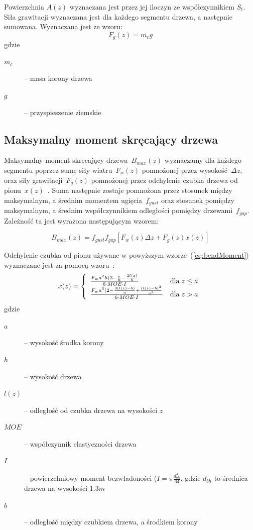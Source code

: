 Powierzchnia $A(z)$ wyznaczana jest przez jej iloczyn ze współczynnikiem $S_t$.
\\

Siła grawitacji wyznaczana jest dla każdego segmentu drzewa, a następnie sumowana. Wyznaczana jest ze wzoru:
\begin{equation}
\label{eq:gravityForce}
	F_g(z) = m_c g
\end{equation}
gdzie
\begin{description}
	\item[$m_c$] -- masa korony drzewa
	\item[$g$] -- przyspieszenie ziemskie
\end{description}

\subsection{Maksymalny moment skręcający drzewa}

Maksymalny moment skręcający drzewa~$B_{max}(z)$ wyznaczamy dla każdego segmentu poprzez sumę siły wiatru~$F_w(z)$ pomnożonej przez wysokość~$\Delta z$, oraz siły grawitacji~$F_g(z)$ pomnożonej przez odchylenie czubka drzewa od pionu~$x(z)$~\cite{chm_ang}. Suma następnie zostaje pomnożona przez stosunek między maksymalnym, a średnim momentem ugięcia~$f_{gust}$ oraz stosunek pomiędzy maksymalnym, a średnim współczynnikiem odległości pomiędzy drzewami~$f_{gap}$. Zależność ta jest wyrażona następującym wzorem:

\begin{equation}
\label{eq:bendMoment}
	B_{max}(z) = f_{gust} f_{gap} [ F_w(z) \Delta z + F_g(z) x(z)]
\end{equation}

Odchylenie czubka od pionu używane w powyższym wzorze~(\ref{eq:bendMoment}) wyznaczane jest za pomocą wzoru~\cite{chm_ang}:
\begin{equation}
	\label{eq:crovnDeviation}
	 x(z) =
	\left\{
	\begin{array}{l r}
  		\frac{F_w a^2h(3- \frac{a}{h} - \frac{3l(z)}{h} }{6 \cdot MOE \cdot I} 	& \text{dla} \; z \leq a\\
	    	\frac{F_w a^3 (2-\frac{3(l(z)-b)}{a} + \frac{(l(z) - b)^3}{a^3}}{6 \cdot MOE \cdot I} & \text{dla} \; z > a\\
	  \end{array} \right.
\end{equation}
gdzie
\begin{description}
	\item[$a$] -- wysokość środka korony
	\item[$h$] -- wysokość drzewa
	\item[$l(z)$] -- odległość od czubka drzewa na wysokości $z$
	\item[$MOE$] -- współczynnik elastyczności drzewa
	\item[$I$] -- powierzchniowy moment bezwładoności ($I = \pi \frac{d_{bh}^4}{64}$, gdzie $d_{bh}$ to średnica drzewa na wysokości $1.3m$
	\item[$b$] -- odległość między czubkiem drzewa, a środkiem korony
\end{description}

